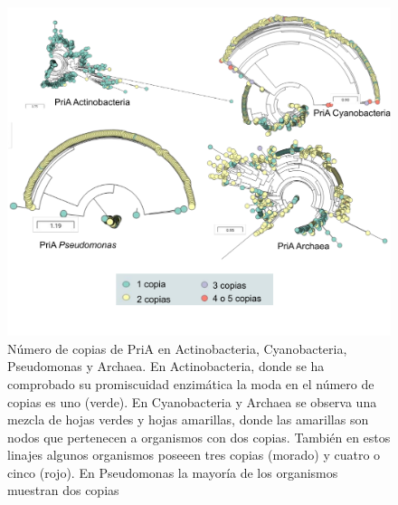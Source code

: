 \documentclass[12pt,twoside]{reedthesis}
\begin{document}
  \begin{figure}[h!tbp]
  \centering
  \includegraphics[angle = 0,scale = 0.8]{chapter4/PriAEvoMiningCopies.pdf}
  \caption[Copias extras de PriA en Actinobacteria, Cyanobacteria, {Pseudomonas} y Archaea]{\footnotesize{Número de copias de PriA en Actinobacteria, Cyanobacteria, {Pseudomonas} y Archaea. En Actinobacteria, donde se ha comprobado su promiscuidad enzimática la moda en el número de copias es uno (verde). En Cyanobacteria y Archaea se observa una mezcla de hojas verdes y hojas amarillas, donde las amarillas son nodos que pertenecen a organismos con dos copias. También en estos linajes algunos organismos poseeen tres copias (morado) y cuatro o cinco (rojo). En {Pseudomonas} la mayoría de los organismos muestran dos copias}}
  \label{fig:PriAEvoMiningCopies}
  \end{figure}
  
\end{document}
